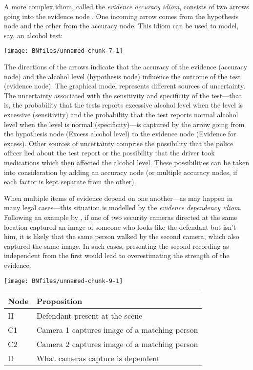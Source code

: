 \documentclass{article}
\begin{document}
A more complex idiom, called the \emph{evidence accuracy
idiom}, consists of two arrows going into the evidence node \citep{bovens2004bayesian, friedman1974}. One incoming arrow comes from the hypothesis node and the other from the accuracy node. This idiom can be used to model, say, 
an alcohol test:
\begin{center}\texttt{[image: BNfiles/unnamed-chunk-7-1]} \end{center}
\noindent The directions of the arrows indicate that the accuracy of the evidence (accuracy node) and the alcohol level (hypothesis node) influence the outcome of the test (evidence node). The graphical model represents different sources of uncertainty. The uncertainty associated with the sensitivity and specificity of the test---that is, the probability that the tests reports excessive alcohol level when the level is excessive (sensitivity) and the probability that the test reports normal alcohol level when the level is normal (specificity)---is captured by the arrow  going from the hypothesis node (\textsf{Excess alcohol level}) to the evidence node (\textsf{Evidence for excess}). Other sources of uncertainty comprise the possibility that the police officer lied about the test report or
the possibility that the driver took medications which then affected the alcohol level. These possibilities can be taken into consideration by adding an accuracy node (or multiple accuracy nodes, if each factor is kept separate from the other).









When multiple items of evidence depend on one another---as may happen in many legal cases---this situation is modelled by the \textit{evidence dependency idiom}. Following an example by \cite{Fenton2018Risk}, if one of two security cameras directed at the same location captured an image of someone who looks like the defendant but isn't him, it is likely that the same person walked by the second camera, which also captured the same image. In such cases, presenting the second recording as independent from the first would lead to overestimating the strength of the evidence.   %

\begin{center}\texttt{[image: BNfiles/unnamed-chunk-9-1]} \end{center}

\begin{center}
\begin{tabular}{@{}lp{7.5cm}@{}}
\toprule
Node &  Proposition\\
\midrule
H &  Defendant present at the scene \\
C1 & Camera 1 captures image of a matching person \\
C2 & Camera 2 captures image of a matching person\\
D &  What cameras capture is dependent \\
\bottomrule
\end{tabular}
\end{center}
\end{document}
